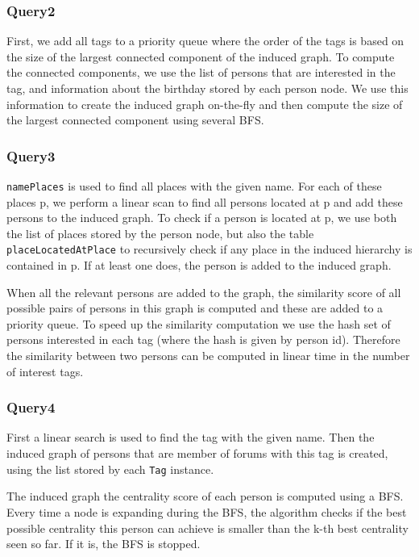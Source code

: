 \documentclass{article}
\begin{document}
\subsubsection{Query2}
First, we add all tags to a priority queue where the order of
the tags is based on the size of the largest connected component of
the induced graph. To compute the connected components, we use the list of persons 
that are interested in the tag, and information about the birthday stored 
by each person node. We use this information to create the induced graph on-the-fly 
and then compute the size of the largest connected component using several BFS.
              
\subsubsection{Query3} \texttt{namePlaces} is used to find all places with
the given name. For each of these places p, we perform a linear scan to find 
all persons located at p and add these persons to the induced graph. 
To check if a person is located at p, we use both the 
list of places stored by the person node, but also the table 
\texttt{placeLocatedAtPlace} to recursively check if any place 
in the induced hierarchy is contained in p. If at least one does, 
the person is added to the induced graph.
              
When all the relevant persons are added to the graph, 
the similarity score of all possible pairs of persons in this
graph is computed and these are added to a priority queue. To speed up
the similarity computation we use the hash set of persons interested in
each tag (where the hash is given by person id). Therefore the similarity 
between two persons can be computed in linear time in the number of 
interest tags.
              
\subsubsection{Query4} First a linear search is used to find the tag with
the given name. Then the induced graph of persons that are member of
forums with this tag is created, using the list stored by each \texttt{Tag} instance.
               
The induced graph the centrality score of each person is computed
using a BFS. Every time a node is expanding during the BFS, the
algorithm checks if the best possible centrality this person can
achieve is smaller than the k-th best centrality seen so far. If it
is, the BFS is stopped. 
\end{document}
